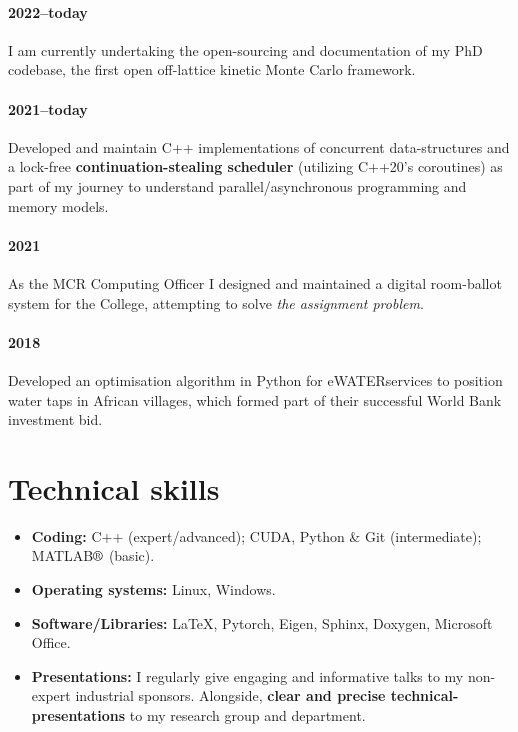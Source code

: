 \documentclass[11pt]{article}
\begin{document}
\paragraph*{2022--today} I am currently undertaking the open-sourcing and documentation of my PhD codebase, the first open off-lattice kinetic Monte Carlo framework. 

\paragraph*{2021--today} Developed and maintain C++ implementations of concurrent data-structures and a lock-free \textbf{continuation-stealing scheduler} (utilizing C++20's coroutines) as part of my journey to understand parallel/asynchronous programming and memory models.

\paragraph*{2021} As the MCR Computing Officer I designed and maintained a digital room-ballot system for the College, attempting to solve \emph{the assignment problem}.

\paragraph*{2018} Developed an optimisation algorithm in Python for eWATERservices to position water taps in African villages, which formed part of their successful World Bank investment bid. 

\section*{Technical skills}
\begin{itemize}[leftmargin=*]
    \setlength{\itemsep}{0pt}
    \item \textbf{Coding:} C++ (expert/advanced); CUDA, Python \&  Git (intermediate); MATLAB$\text{\textregistered}$ (basic).
    \item \textbf{Operating systems:} Linux, Windows.
    \item \textbf{Software/Libraries:} \LaTeX, Pytorch, Eigen, Sphinx, Doxygen, Microsoft Office.
    \item \textbf{Presentations:} I regularly give engaging and informative talks to my non-expert industrial sponsors. Alongside, \textbf{clear and precise technical-presentations} to my research group and department.
          
\end{itemize}
\end{document}

